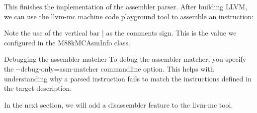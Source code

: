 This finishes the implementation of the assembler parser. After building LLVM, we can use the llvm-mc machine code playground tool to assemble an instruction:


Note the use of the vertical bar | as the comments sign. This is the value we configured in the M88kMCAsmInfo class.

\begin{myTip}{Debugging the assembler matcher}
To debug the assembler matcher, you specify the -{}-debug-only=asm-matcher commandline option. This helps with understanding why a parsed instruction fails to match the instructions defined in the target description.
\end{myTip}

In the next section, we will add a disassembler feature to the llvm-mc tool.































